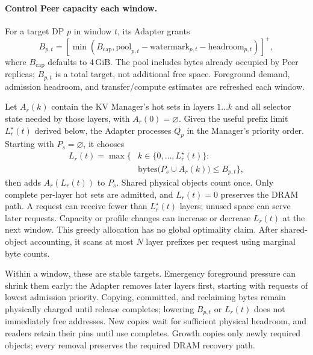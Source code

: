 \paragraph{Control Peer capacity each window.}
For a target DP $p$ in window $t$, its Adapter grants
\begin{equation}
 B_{p,t}=[\min(B_{\mathrm{cap}},\mathrm{pool}_{p,t}
              -\mathrm{watermark}_{p,t}-\mathrm{headroom}_{p,t})]^+,
 \label{eq:peer-budget}
\end{equation}
where $B_{\mathrm{cap}}$ defaults to 4\,GiB. The pool includes bytes
already occupied by Peer replicas; $B_{p,t}$ is a total target, not
additional free space. Foreground demand, admission headroom, and
transfer/compute estimates are refreshed each window.

Let $A_r(k)$ contain the KV Manager's hot sets in layers $1\ldots k$
and all selector state needed by those layers, with $A_r(0)=\varnothing$.
Given the useful prefix limit $L_r^\star(t)$ derived below, the Adapter
processes $Q_p$ in the Manager's priority order. Starting with $P_s=\varnothing$,
it chooses
\begin{equation}
 \begin{aligned}
 L_r(t)=\max\bigl\{&k\in\{0,\ldots,L_r^\star(t)\}:\\
                  &\mathrm{bytes}\bigl(P_s\cup A_r(k)\bigr)\le B_{p,t}\bigr\},
 \end{aligned}
 \label{eq:resident-prefix}
\end{equation}
then adds $A_r(L_r(t))$ to $P_s$. Shared physical objects count once.
Only complete per-layer hot sets are admitted, and $L_r(t)=0$ preserves
the DRAM path. A request can receive fewer than $L_r^\star(t)$ layers;
unused space can serve later requests. Capacity or profile changes can
increase or decrease $L_r(t)$ at the next window. This greedy allocation
has no global optimality claim. After shared-object accounting, it scans
at most $N$ layer prefixes per request using marginal byte counts.

Within a window, these are stable targets. Emergency foreground pressure
can shrink them early: the Adapter removes later layers first, starting
with requests of lowest admission priority. Copying, committed, and
reclaiming bytes remain physically charged until release completes;
lowering $B_{p,t}$ or $L_r(t)$ does not immediately free addresses.
New copies wait for sufficient physical headroom, and readers retain
their pins until use completes. Growth copies only newly required
objects; every removal preserves the required DRAM recovery path.
